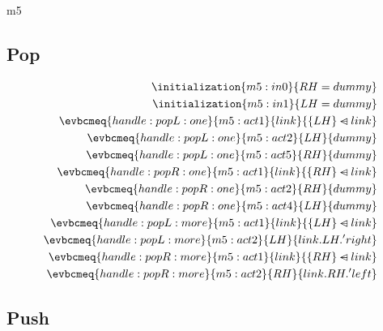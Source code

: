 \documentclass[12pt]{amsart}
\begin{document}
\begin{machine}{m5}
\subsection{Pop}
  \begin{align}
    \initialization{m5:in0}{ RH = dummy } \\
    \initialization{m5:in1}{ LH = dummy } \\
    \evbcmeq{handle:popL:one}{m5:act1}{link}
      { \{ LH \} \domsub link } \\
    \evbcmeq{handle:popL:one}{m5:act2}{LH}
      { dummy } \\
    \evbcmeq{handle:popL:one}{m5:act5}{RH}
      { dummy } \\
    \evbcmeq{handle:popR:one}{m5:act1}{link}
      { \{ RH \} \domsub link } \\
    \evbcmeq{handle:popR:one}{m5:act2}{RH}
      { dummy } \\
    \evbcmeq{handle:popR:one}{m5:act4}{LH}
      { dummy } \\
    \evbcmeq{handle:popL:more}{m5:act1}{link}
      { \{ LH \} \domsub link } \\
    \evbcmeq{handle:popL:more}{m5:act2}
      {LH}{ link.LH.'right } \\
    \evbcmeq{handle:popR:more}{m5:act1}{link}
      { \{ RH \} \domsub link } \\
    \evbcmeq{handle:popR:more}{m5:act2}{RH}
      { link.RH.'left } 
  \end{align}
\subsection{Push}

\end{machine}
\end{document}
